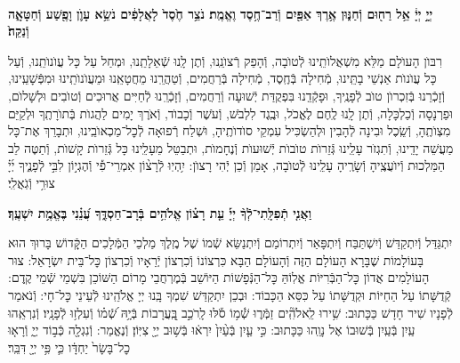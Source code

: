 \documentclass[twoside, openany, parskip=half, 11pt]{book}
\begin{document}




\pesicha

\begin{sometimes}

\\
 \textbf{יְיָ֣ יְיָ֔ אֵ֥ל רַח֖וּם וְֿחַנּ֑וּן אֶ֥רֶךְ אַפַּ֖יִם וְֿרַב־חֶ֥סֶד וֶאֱמֶֽת׃ נֹצֵ֥ר חֶ֙סֶד֙ לָאֲלָפִ֔ים נֹשֵׂ֥א עָוֺ֛ן וָפֶ֖שַׁע וְֿחַטָּאָ֑ה וְֿנַקֵּה֙׃}

רִבּוֺן הָעוׂלָם מַלֵּא מִשְׁאֲלוׂתֵֽינוּ לְֿטוׂבָה, וְֿהָפֵק רְֿצוׂנֵֽנוּ, וְֿתֶן לָֽנוּ שְֿׁאֵלָתֵֽנוּ, וּמְחַל עַל כָּל עֲוׂנוׂתֵֽנוּ, וְֿעַל כָּל עֲוׂנוׂת אַנְשֵׁי בָתֵּֽינוּ, מְֿחִילָה בְּֿחֶֽסֶד, מְֿחִילָה בְּֿרַחֲמִים, וְֿטַהֲרֵֽנוּ מֵחֲטָאֵֽנוּ וּמֵעֲוׂנוׂתֵֽינוּ וּמִפְּֿשָׁעֵֽינוּ, וְֿזָכְֿרֵנוּ בְּֿזִכְרוׂן טוׂב לְֿפָנֶֽיךָ, וּפָקְֿדֵֽנוּ בִּפְקֻדַּת יְֿשׁוּעָה וְֿרַחֲמִים, וְֿזָכְֿרֵֽנוּ לְֿחַיִּים אֲרוּכִים וְֿטוׂבִים וּלְשָׁלוׂם, וּפַרְנָסָה וְֿכַלְכָּלָה, וְֿתֶן לָֽנוּ לֶֽחֶם לֶאֱכׂל, וּבֶֽגֶד לִלְבּׂשׁ, וְֿעׂשֶׁר וְֿכָבוׂד, וְֿאׂרֶךְ יָמִים לַהֲגוׂת בְּֿתוׂרָתֶֽךָ וּלְקַיֵּם מִצְוׂתֶֽהָ, וְֿשֵֽׂכֶל וּבִינָה לְֿהָבִין וּלְהַשְׂכִּיל עִמְקֵי סוׂדוׂתֶֽיהָ, וּשְׁלַח רְֿפוּאָה לְֿכׇל־מַכְאוׂבֵֽינוּ, וּתְבָרֵךְ אֶת־כָּל מַעֲשֵׁה יָדֵֽינוּ, וְֿתִגְזׂר עָלֵֽינוּ גְּֿזֵרוׂת טוׂבוׂת יְֿשׁוּעוׂת וְֿנֶחָמוׂת, וּתְבַטֵּל מֵעָלֵֽינוּ כָּל גְּֿזֵרוׂת קָשׁוׂת, וְֿתַטֶּה לֵב הַמַּלְכוּת וְֿיוׂעֲצֶֽיהָ וְֿשָׂרֶֽיהָ עָלֵֽינוּ לְֿטוׂבָה, אָמֵן וְֿכֵן יְֿהִי רָצוׂן:
%
יִ֥הְיֽוּ לְֿרָצ֨וֹן אִמְרֵי־פִ֡י וְֿהֶגְי֣וֹן לִבִּ֣י לְֿפָנֶ֑יךָ יְ֜יָ֗ צוּרִ֥י וְֿגֹֽאֲלִֽי׃


\textbf{וַאֲנִ֤י תְֿפִלָּֽתִי־לְֿךָ֨ יְיָ֡ עֵ֤ת רָצ֗וֹן אֱלֹהִ֥ים בְּֿרָב־חַסְדֶּ֑ךָ עֲ֝נֵ֗נִי בֶּאֱמֶ֥ת יִשְׁעֶֽךָ׃}

\end{sometimes}

\gadlu

\label{al hakol}
יִתְגַּדַּל וְֿיִתְקַדַּשׁ וְֿיִשְׁתַּבַּח וְֿיִתְפָּאַר וְֿיִתְרוֹמַם וְֿיִתְנַשֵּׂא שְֿׁמוֹ שֶׁל מֶֽלֶךְ מַלְכֵי הַמְּֿלָכִים הַקְָּֿדוֹשׁ בָּרוּךְ הוּא בָּעוֹלָמוֹת שֶׁבָּרָא הָעוֹלָם הַזֶּה וְֿהָעוֹלָם הַבָּא כִּרְצוֹנוֹ וְֿכִרְצוֹן יְֿרֵאָיו וְֿכִרְצוֹן כׇּל־בֵּית יִשְׂרָאֵל: צוּר הָעוֹלָמִים אֲדוֹן כׇּל־הַבְּֿרִיּוֹת אֱלֽוֹהַּ כׇּל־הַנְּֿפָשׁוֹת הַיּוֹשֵׁב בְּֿמֶרְחֲבֵי מָרוֹם הַשּׁוֹכֵן בִּשְׁמֵי שְֿׁמֵי קֶֽדֶם: קְֿדֻשָּׁתוֹ עַל הַחַיּוֹת וּקְדֻשָּׁתוֹ עַל כִּסֵּא הַכָּבוֹד: וּבְכֵן יִתְקַדַּשׁ שִׁמְךָ בָּֽנוּ יְיָ אֱלֹהֵֽינוּ לְֿעֵינֵי כׇּל־חָי: וְֿנֹאמַר לְֿפָנָיו שִׁיר חָדָשׁ כַּכָּתוּב:
שִׁ֥ירוּ לֵֽאלֹהִֽ֘ים זַמְּֿר֢וּ שְֿׁ֫מ֥וֹ סֹ֡לּוּ לָֽרֹכֵ֣ב בָּֽ֭עֲרָבוֹת בְּֿיָ֥הּ שְֿׁ֝מ֗וֹ וְֿעִלְז֥וּ לְֿפָנָֽיו׃ וְֿנִרְאֵֽהוּ עַֽיִן בְּֿעַֽיִן בְּֿשׁוּבוֹ אֶל נָוֵֽהוּ כַּכָּתוּב:
%
כִּ֣י עַ֤יִן בְּֿעַ֨יִן֙ יִרְא֔וּ בְּֿשׁ֥וּב יְיָ֖ צִיּֽוֹן׃ וְֿנֶאֱמַר:
וְֿנִגְלָ֖ה כְּֿב֣וֹד יְיָ֑ וְֿרָא֤וּ כׇל־בָּשָׂר֙ יַחְדָּ֔ו כִּ֛י פִּ֥י יְיָ֖ דִּבֵּֽר׃
\end{document}
